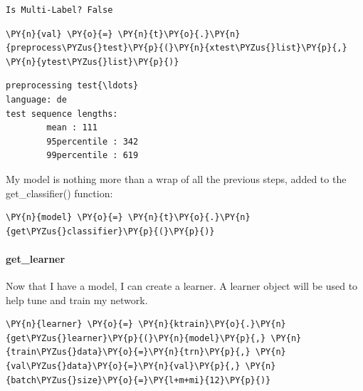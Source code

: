     \begin{Verbatim}[commandchars=\\\{\},fontsize=\footnotesize]
Is Multi-Label? False
    \end{Verbatim}

    \begin{tcolorbox}[breakable, size=fbox, boxrule=1pt, pad at break*=1mm,colback=cellbackground, colframe=cellborder]
\begin{Verbatim}[commandchars=\\\{\},fontsize=\footnotesize]
\PY{n}{val} \PY{o}{=} \PY{n}{t}\PY{o}{.}\PY{n}{preprocess\PYZus{}test}\PY{p}{(}\PY{n}{xtest\PYZus{}list}\PY{p}{,} \PY{n}{ytest\PYZus{}list}\PY{p}{)}
\end{Verbatim}
\end{tcolorbox}

    \begin{Verbatim}[commandchars=\\\{\},fontsize=\footnotesize]
preprocessing test{\ldots}
language: de
test sequence lengths:
        mean : 111
        95percentile : 342
        99percentile : 619
    \end{Verbatim}
    
My model is nothing more than a wrap of all the previous steps, added to the get\_classifier() function:  
    \begin{tcolorbox}[breakable, size=fbox, boxrule=1pt, pad at break*=1mm,colback=cellbackground, colframe=cellborder]
\begin{Verbatim}[commandchars=\\\{\},fontsize=\footnotesize]
\PY{n}{model} \PY{o}{=} \PY{n}{t}\PY{o}{.}\PY{n}{get\PYZus{}classifier}\PY{p}{(}\PY{p}{)}
\end{Verbatim}
\end{tcolorbox}


\paragraph{get\_learner}
Now that I have a model, I can create a learner. A learner object will be used to help tune and train my network.
    \begin{tcolorbox}[breakable, size=fbox, boxrule=1pt, pad at break*=1mm,colback=cellbackground, colframe=cellborder]
\begin{Verbatim}[commandchars=\\\{\},fontsize=\footnotesize]
\PY{n}{learner} \PY{o}{=} \PY{n}{ktrain}\PY{o}{.}\PY{n}{get\PYZus{}learner}\PY{p}{(}\PY{n}{model}\PY{p}{,} \PY{n}{train\PYZus{}data}\PY{o}{=}\PY{n}{trn}\PY{p}{,} \PY{n}{val\PYZus{}data}\PY{o}{=}\PY{n}{val}\PY{p}{,} \PY{n}{batch\PYZus{}size}\PY{o}{=}\PY{l+m+mi}{12}\PY{p}{)}
\end{Verbatim}
\end{tcolorbox}
